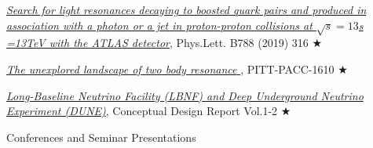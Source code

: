 \begin{minipage}{0.8\textwidth}
\begin{minipage}{1.0\textwidth}
\vspace{0.15in}
\href{https://arxiv.org/abs/1708.03247}{\textit{Search for light resonances decaying to boosted quark pairs and produced in association with a photon or a jet in proton-proton collisions at $\sqrt{s} = 13$s =13TeV with the ATLAS detector}}, Phys.Lett. B788 (2019) 316 $\bigstar$

\vspace{0.15in}
\href{https://arxiv.org/abs/1610.09392}{\textit{The unexplored landscape of two body resonance }}, PITT-PACC-1610 $\bigstar$

\vspace{0.15in}
\href{https://arxiv.org/abs/1601.05471}{\textit{Long-Baseline Neutrino Facility (LBNF) and Deep Underground Neutrino Experiment (DUNE)}}, Conceptual Design Report Vol.1-2 $\bigstar$




\end{minipage}

\end{minipage}

\newpage
{\Large Conferences and Seminar Presentations}\\
\HRule

\vspace{0.15in}

